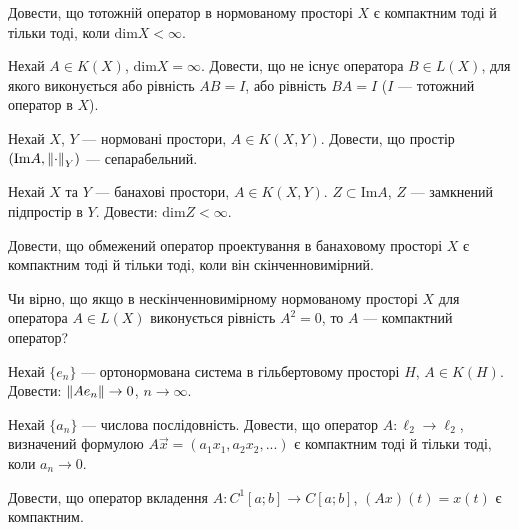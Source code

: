 \begin{exercise}
    Довести, що тотожній оператор в нормованому просторі $X$ є компактним
    тоді й тільки тоді, коли $\mathrm{dim} X < \infty$.
\end{exercise}

\begin{exercise}
    Нехай $A \in K(X)$, $\mathrm{dim} X = \infty$. Довести, що не існує оператора
    $B \in L(X)$, для якого виконується або рівність $AB = I$, або рівність $BA = I$ 
    ($I$ --- тотожний оператор в $X$).
\end{exercise}

\begin{exercise}
    Нехай $X$, $Y$ --- нормовані простори, $A \in K(X, Y)$. Довести, що простір $\left( \mathrm{Im} A, \left\lVert\cdot\right\rVert_Y\right)$ --- сепарабельний.
\end{exercise}

\begin{exercise}
    Нехай $X$ та $Y$ --- банахові простори, $A \in K(X, Y)$. $Z \subset \mathrm{Im} A$, 
    $Z$ --- замкнений підпростір в $Y$. Довести: $\mathrm{dim} Z < \infty$.
\end{exercise}

\begin{exercise}
    Довести, що обмежений оператор проектування в банаховому просторі $X$
    є компактним тоді й тільки тоді, коли він скінченновимірний.
\end{exercise}

\begin{exercise}
    Чи вірно, що якщо в нескінченновимірному нормованому просторі $X$ для оператора $A \in L(X)$
    виконується рівність $A^2 = 0$, то $A$ --- компактний оператор?
\end{exercise}

\begin{exercise}
    Нехай $\{e_n\}$ --- ортонормована система в гільбертовому просторі $H$, $A \in K(H)$.
    Довести: $\left\lVert A e_n\right\rVert \to 0$, $n \to \infty$.
\end{exercise}

\begin{exercise}
    Нехай $\{a_n\}$ --- числова послідовність. Довести, що оператор $A: \ell_2 \to \ell_2$,
    визначений формулою $A\vec{x} = (a_1 x_1, a_2 x_2, ...)$ є компактним тоді й тільки тоді,
    коли $a_n \to 0$.
\end{exercise}

\begin{exercise}
    Довести, що оператор вкладення $A: C^1 [a;b] \to C[a;b]$, $(Ax)(t) = x(t)$ є компактним.
\end{exercise}